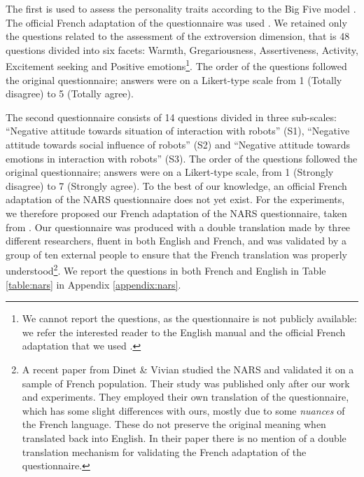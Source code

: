 The first is used to assess the personality traits according to the Big Five model \cite{BIGFIVE}. The official French adaptation of the questionnaire was used \cite{NEOPIR1998}. We retained only the questions related to the assessment of the extroversion dimension, that is 48 questions divided into six facets: Warmth, Gregariousness, Assertiveness, Activity, Excitement seeking and Positive emotions\footnote{We cannot report the questions, as the questionnaire is not publicly available: we refer the interested reader to the English manual \cite{NEOPIR1992} and the official French adaptation that we used \cite{NEOPIR1998}.}.
The order of the questions followed the original questionnaire; answers were on a Likert-type scale from 1 (Totally disagree) to 5 (Totally agree). 


The second questionnaire consists of 14 questions divided in three sub-scales: ``Negative attitude towards situation of interaction with robots'' (S1), ``Negative attitude towards social influence of robots'' (S2) and ``Negative attitude towards emotions in interaction with robots'' (S3). The order of the questions followed the original questionnaire; answers were on a Likert-type scale, from 1 (Strongly disagree) to 7 (Strongly agree).
To the best of our knowledge, an official French adaptation of the NARS questionnaire does not yet exist. 
For the experiments, we therefore proposed our French adaptation of the NARS questionnaire, taken from \cite{Nomura2006nars}. 
Our questionnaire was produced with a double translation made by three different researchers, fluent in both English and French, and was validated by a group of ten external people to ensure that the French translation was properly understood\footnote{A recent paper from Dinet \& Vivian \cite{NARSfrench} studied the NARS and validated it on a sample of French population. Their study was published only after our work and experiments. They employed their own translation of the questionnaire, which has some slight differences with ours, mostly due to some \textit{nuances} of the French language. These do not preserve the original meaning when translated back into English. In their paper there is no mention of a double translation mechanism for validating the French adaptation of the questionnaire.}.
We report the questions in both French and English in Table \ref{table:nars} in Appendix \ref{appendix:nars}.


